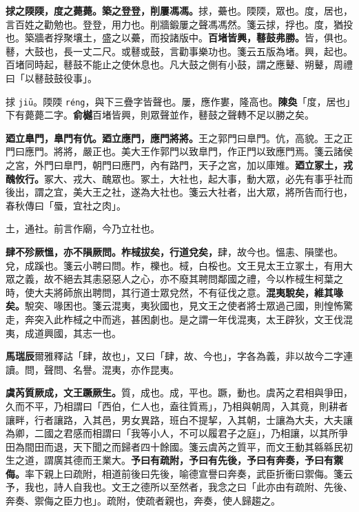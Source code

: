 \textbf{捄之陾陾，度之薨薨。築之登登，削屢馮馮。}{\footnotesize 捄，虆也。陾陾，眾也。度，居也，言百姓之勸勉也。登登，用力也。削牆鍛屢之聲馮馮然。箋云捄，捊也。度，猶投也。築牆者捊聚壤土，盛之以虆，而投諸版中。}\textbf{百堵皆興，鼛鼓弗勝。}{\footnotesize 皆，俱也。鼛，大鼓也，長一丈二尺。或鼛或鼓，言勸事樂功也。箋云五版為堵。興，起也。百堵同時起，鼛鼓不能止之使休息也。凡大鼓之側有小鼓，謂之應鼙、朔鼙，周禮曰「以鼛鼓鼓役事」。}

\begin{quoting}捄 \texttt{jiū}。陾陾 \texttt{réng}，與下三疊字皆聲也。屢，應作婁，隆高也。\textbf{陳奐}「度，居也」下有薨薨二字。\textbf{俞樾}百堵皆興，則眾聲並作，鼛鼓之聲轉不足以勝之矣。\end{quoting}

\textbf{廼立臯門，臯門有伉。廼立應門，應門將將。}{\footnotesize 王之郭門曰臯門。伉，高貌。王之正門曰應門。將將，嚴正也。美大王作郭門以致臯門，作正門以致應門焉。箋云諸侯之宮，外門曰臯門，朝門曰應門，內有路門，天子之宮，加以庫雉。}\textbf{廼立冢土，戎醜攸行。}{\footnotesize 冢大、戎大、醜眾也。冢土，大社也，起大事，動大眾，必先有事乎社而後出，謂之宜，美大王之社，遂為大社也。箋云大社者，出大眾，將所告而行也，春秋傳曰「蜃，宜社之肉」。}

\begin{quoting}土，通社。前言作廟，今乃立社也。\end{quoting}

\textbf{肆不殄厥慍，亦不隕厥問。柞棫拔矣，行道兌矣，}{\footnotesize 肆，故今也。慍恚、隕墜也。兌，成蹊也。箋云小聘曰問。柞，櫟也。棫，白桵也。文王見太王立冢土，有用大眾之義，故不絕去其恚惡惡人之心，亦不廢其聘問鄰國之禮，今以柞棫生柯葉之時，使大夫將師旅出聘問，其行道士眾兌然，不有征伐之意。}\textbf{混夷駾矣，維其喙矣。}{\footnotesize 駾突、喙困也。箋云混夷，夷狄國也，見文王之使者將士眾過己國，則惶怖驚走，奔突入此柞棫之中而逃，甚困劇也。是之謂一年伐混夷，太王辟狄，文王伐混夷，成道興國，其志一也。}

\begin{quoting}\textbf{馬瑞辰}爾雅釋詁「肆，故也」，又曰「肆，故、今也」，字各為義，非以故今二字連讀。問，聲問、名譽。混夷，亦作昆夷。\end{quoting}

\textbf{虞芮質厥成，文王蹶厥生。}{\footnotesize 質，成也。成，平也。蹶，動也。虞芮之君相與爭田，久而不平，乃相謂曰「西伯，仁人也，盍往質焉」，乃相與朝周，入其竟，則耕者讓畔，行者讓路，入其邑，男女異路，班白不提挈，入其朝，士讓為大夫，大夫讓為卿，二國之君感而相謂曰「我等小人，不可以履君子之庭」，乃相讓，以其所爭田為間田而退，天下聞之而歸者四十餘國。箋云虞芮之質平，而文王動其緜緜民初生之道，謂廣其德而王業大。}\textbf{予曰有疏附，予曰有先後，予曰有奔奏，予曰有禦侮。}{\footnotesize 率下親上曰疏附，相道前後曰先後，喻德宣譽曰奔奏，武臣折衝曰禦侮。箋云予，我也，詩人自我也。文王之德所以至然者，我念之曰「此亦由有疏附、先後、奔奏、禦侮之臣力也」。疏附，使疏者親也，奔奏，使人歸趨之。}

